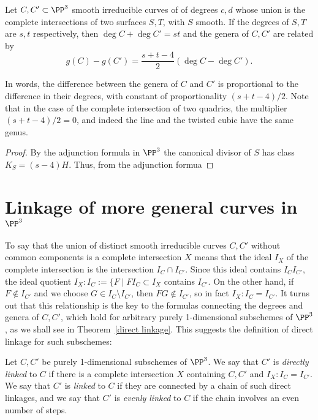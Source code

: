\begin{theorem}\label{liaison genus formula-first version} Let $C, {C'}\subset \PP^3$ smooth irreducible curves of  of degrees $c,d$ whose union is the complete intersections of two surfaces $S,T$, with $S$ smooth. If the degrees of $S,T$ are $s,t$ respectively, then $\deg C+\deg C' = st$ and the genera of $C,C'$ are
related by
 $$
 g(C) - g({C'}) = \frac{s+t-4}{2}(\deg C-\deg {C'}).
 $$
\end{theorem}
In words, the difference between the genera of $C$ and ${C'}$ is proportional to the difference in their degrees, with constant of proportionality $(s+t-4)/2$. Note that in the case of the complete intersection of two quadrics, the multiplier $(s+t-4)/2 = 0$, and indeed the line and the twisted cubic have the same genus.

\begin{proof}
By the adjunction formula in $\PP^3$ the canonical divisor of $S$ has class $K_S = (s-4)H$. Thus, from the 
adjunction formua
\end{proof}


\section{Linkage of more general curves in $\PP^3$}
To say that the union of distinct smooth irreducible curves $C, C'$ without common components is a complete intersection $X$ means that 
the ideal $I_X$ of the complete intersection is the intersection $I_C\cap I_{C'}$. Since this ideal contains $I_CI_{C'}$, the ideal quotient
$I_X:I_C:= \{F \mid FI_C\subset I_X$
contains $I_{C'}$. On the other hand, if $F \notin I_{C'}$ and we choose $G\in I_C\setminus I_{C'}$, then $FG\notin I_{C'}$, so in fact
$I_X:I_C = I_{C'}$. It turns out that this relationship is the key to the formulas connecting the degrees and genera of $C,C'$, which hold 
for arbitrary purely 1-dimensional subschemes of $\PP^3$, as we shall see in Theorem~\ref{direct linkage}. This suggests the definition
of direct linkage for such subschemes:

\begin{definition}
Let $C,C'$ be purely 1-dimensional subschemes of $\PP^3$. We say that $C'$ is \emph{directly linked} to $C$ if there is a complete
intersection $X$ containing $C,C'$ and $I_X:I_C = I_{C'}$. We say that $C'$ is \emph{linked} to $C$ if they are connected by a chain of such
direct linkages, and we say that $C'$ is \emph{evenly linked} to $C$ if the chain involves an even number of steps.
\end{definition}

